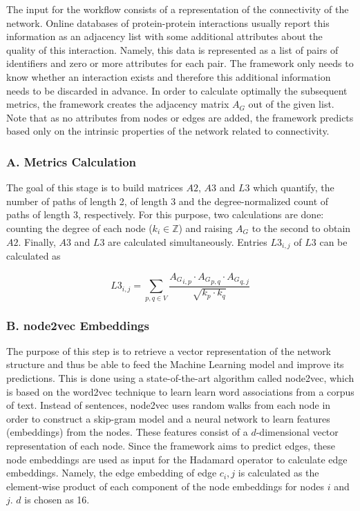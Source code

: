 The input for the workflow consists of a representation of the connectivity of the network.
Online databases of protein-protein interactions usually report this information as an 
adjacency list with some additional attributes about the quality of this interaction. Namely, 
this data is represented as a list of pairs of identifiers and zero or more attributes for 
each pair. The framework only needs to know whether an interaction exists and therefore this 
additional information needs to be discarded in advance. In order to calculate optimally the
subsequent metrics, the framework creates the adjacency matrix $A_G$ out of the given list. 
Note that as no attributes from nodes or edges are added, the framework predicts based only 
on the intrinsic properties of the network related to connectivity. 

\subsubsection*{A. Metrics Calculation}
The goal of this stage is to build matrices $A2$, $A3$ and $L3$ which quantify, 
the number of paths of length 2, of length 3 and the degree-normalized count of 
paths of length 3, respectively. For this purpose, two calculations are done: 
counting the degree of each node ($k_i \in \mathbb{Z}$) and raising $A_G$ to the 
second to obtain $A2$. Finally, $A3$ and $L3$  are calculated simultaneously. 
Entries $L3_{i,j}$ of $L3$ can be calculated as 

\begin{equation}
  L3_{i,j}=\sum_{p,q\in V}\frac{{A_G}_{i,p}\cdot {A_G}_{p,q}\cdot {A_G}_{q,j}}{\sqrt{k_{p}\cdot k_{q}}}
\end{equation}

\subsubsection*{B. node2vec Embeddings}
The purpose of this step is to retrieve a vector representation of the network 
structure and thus be able to feed the Machine Learning model and improve its 
predictions. This is done using a state-of-the-art algorithm called node2vec, 
which is based on the word2vec technique to learn learn word associations from
a corpus of text. Instead of sentences, node2vec uses 
random walks from each node in order to construct a skip-gram model and a neural 
network to learn features (embeddings) from the nodes\cite{Grover_2016}. These 
features consist of a $d$-dimensional vector representation of each node.
Since the framework aims to predict edges, these node embeddings are used as 
input for the Hadamard operator to calculate edge embeddings. Namely, the edge 
embedding of edge $c_i,j$ is calculated as the element-wise product of each 
component of the node embeddings for nodes $i$ and $j$. $d$ is chosen as 16.

